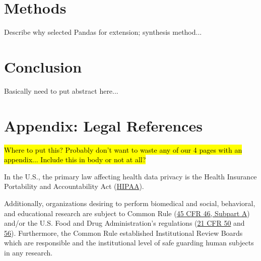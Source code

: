 \documentclass{article}
\begin{document}
\section{Methods}

Describe why selected Pandas for extension; synthesis method...

\section{Conclusion}

Basically need to put abstract here...

\section{Appendix: Legal References}

\hl{Where to put this? Probably don't want to waste any of our 4 pages with an appendix... Include this in body or not at all?}


In the U.S., the primary law affecting health data privacy is the Health Insurance Portability and Accountability Act (\href{https://www.hhs.gov/hipaa/for-professionals/index.html}{HIPAA}). 


Additionally, organizations desiring to perform biomedical and social, behavioral, and educational research are subject to Common Rule (\href{https://www.hhs.gov/ohrp/regulations-and-policy/regulations/45-cfr-46/index.html#subparta}{45 CFR 46, Subpart A}) and/or the U.S. Food and Drug Administration’s regulations (\href{https://www.ecfr.gov/cgi-bin/text-idx?SID=faa4b2b2900a70fbcac4a773c9da0f0f&mc=true&node=pt21.1.50&rgn=div5}{21 CFR 50} and \href{https://www.ecfr.gov/cgi-bin/text-idx?SID=faa4b2b2900a70fbcac4a773c9da0f0f&mc=true&node=pt21.1.56&rgn=div5}{56}). Furthermore, the Common Rule established Institutional Review Boards which are responsible and the institutional level of safe guarding human subjects in any research. 




\end{document}
